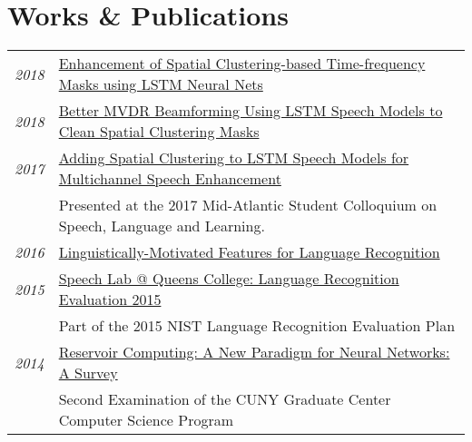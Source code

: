\documentclass[a4paper,10pt]{article}
\begin{document}
\section{Works \& Publications}
    \vspace{0.2cm}
    \begin{tabular}{rp{14cm}}
        \hspace{2.5cm}\emph{2018} & \href{https://grezesf.github.io/papers/2018_ICASSP18__Enhancement_of_Spatial_Clustering_Based_Time_Frequency_Masks_using_LSTM_Neural_Networks.pdf}{Enhancement of Spatial Clustering-based Time-frequency Masks using LSTM Neural Nets}
        \vspace{0.15cm} \\

        \emph{2018} & \href{https://grezesf.github.io/papers/2018_IS18_Improved_MVDR_Beamforming_Using_LSTM_Speech_Models_to_Clean_Spatial_Clustering_Masks.pdf}{Better MVDR Beamforming Using LSTM Speech Models to Clean Spatial Clustering Masks}
        \vspace{0.15cm} \\

        \emph{2017} & \href{https://grezesf.github.io/papers/2017_IS17_Combining_Spatial_Clustering_with_LSTM_Speech_Models_for_Multichannel_Speech_Enhancement.pdf}{Adding Spatial Clustering to LSTM Speech Models for Multichannel Speech Enhancement}\\
        & \small{Presented at the 2017 Mid-Atlantic Student Colloquium on Speech, Language and Learning.}
        \vspace{0.15cm} \\

        \emph{2016} & \href{https://grezesf.github.io/papers/2015_LRE15_linguistically-motivated-features.pdf}{Linguistically-Motivated Features for Language Recognition}
        \vspace{0.15cm} \\

        \emph{2015} & \href{https://grezesf.github.io/papers/2015_LRE15.pdf}{Speech Lab @ Queens College: Language Recognition Evaluation 2015} \\
        & \small{Part of the 2015 NIST Language Recognition Evaluation Plan}
        \vspace{0.15cm} \\

        \emph{2014} & \href{https://grezesf.github.io/papers/2014_09_04_Second_Exam_Survey_Felix_Grezes.pdf}{Reservoir Computing: A New Paradigm for Neural Networks: A Survey}\\
        & \small{Second Examination of the CUNY Graduate Center Computer Science Program}
        \vspace{0.15cm} \\


\end{tabular}
\end{document}
